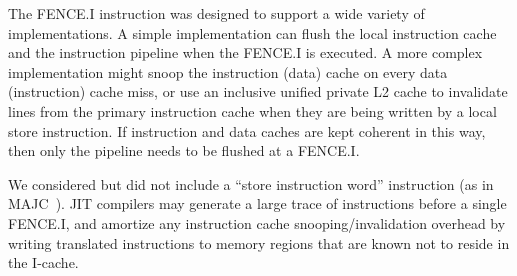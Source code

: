 \begin{commentary}
The FENCE.I instruction was designed to support a wide variety of
implementations.  A simple implementation can flush the local
instruction cache and the instruction pipeline when the FENCE.I is
executed.  A more complex implementation might snoop the instruction
(data) cache on every data (instruction) cache miss, or use an
inclusive unified private L2 cache to invalidate lines from the
primary instruction cache when they are being written by a local store
instruction.  If instruction and data caches are kept coherent in this
way, then only the pipeline needs to be flushed at a FENCE.I.

We considered but did not include a ``store instruction word''
instruction (as in MAJC~\cite{majc}).  JIT compilers may generate a
large trace of instructions before a single FENCE.I, and amortize any
instruction cache snooping/invalidation overhead by writing translated
instructions to memory regions that are known not to reside in the
I-cache.
\end{commentary}
